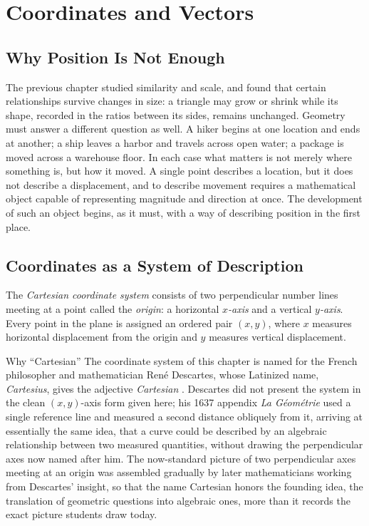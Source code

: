 \chapter{Coordinates and Vectors}
\label{ch:ch02-coordinates-vectors}

\section{Why Position Is Not Enough}

The previous chapter studied similarity and scale, and found that certain
relationships survive changes in size: a triangle may grow or shrink while
its shape, recorded in the ratios between its sides, remains unchanged.
Geometry must answer a different question as well. A hiker begins at one
location and ends at another; a ship leaves a harbor and travels across open
water; a package is moved across a warehouse floor. In each case what
matters is not merely where something is, but how it moved. A single point
describes a location, but it does not describe a displacement, and to
describe movement requires a mathematical object capable of representing
magnitude and direction at once. The development of such an object begins,
as it must, with a way of describing position in the first place.

\section{Coordinates as a System of Description}

\begin{definition}
The \emph{Cartesian coordinate system} consists of two perpendicular number
lines meeting at a point called the \emph{origin}: a horizontal
\emph{$x$-axis} and a vertical \emph{$y$-axis}. Every point in the plane is
assigned an ordered pair $(x,y)$, where $x$ measures horizontal displacement
from the origin and $y$ measures vertical displacement.
\end{definition}

\begin{historicalnote}{Why ``Cartesian''}
The coordinate system of this chapter is named for the French philosopher
and mathematician Ren\'e Descartes, whose Latinized name,
\emph{Cartesius}, gives the adjective \emph{Cartesian} \cite{boyer1991}.
Descartes did not present the system in the clean $(x,y)$-axis form given
here; his 1637 appendix \emph{La G\'eom\'etrie} used a single reference
line and measured a second distance obliquely from it, arriving at
essentially the same idea, that a curve could be described by an
algebraic relationship between two measured quantities, without drawing
the perpendicular axes now named after him. The now-standard picture of
two perpendicular axes meeting at an origin was assembled gradually by
later mathematicians working from Descartes' insight, so that the name
Cartesian honors the founding idea, the translation of geometric
questions into algebraic ones, more than it records the exact picture
students draw today.
\end{historicalnote}

